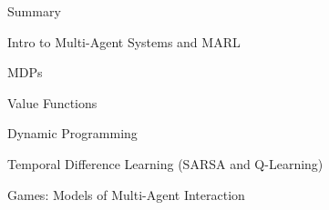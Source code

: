         




\begin{frame}{Summary}

\blist
    \item Intro to Multi-Agent Systems and MARL
    \item MDPs
    \item Value Functions
    \item Dynamic Programming
    \item Temporal Difference Learning (SARSA and Q-Learning)
\elist
{}
\blist
    \item Games: Models of Multi-Agent Interaction
\elist

\end{frame}

